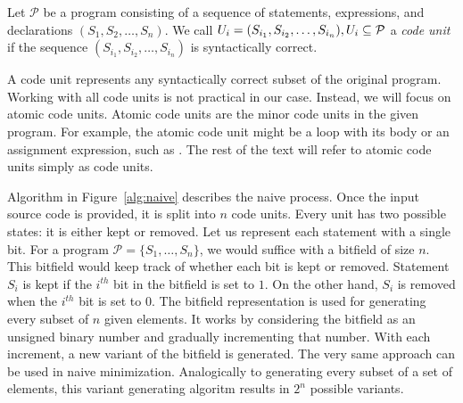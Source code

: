 \begin{defn}\label{def04:3}
  Let $\mathcal{P}$ be a program consisting of a sequence of statements, 
  expressions, and declarations $(S_1, S_2, \ldots, S_n)$. 
  We call $U_i = (S_{i_1},\-S_{i_2},\-\ldots,\-S_{i_n}), 
  U_i \subseteq \mathcal{P}$ a \emph{code unit} if the sequence 
  $(S_{i_1}, S_{i_2}, \ldots, S_{i_n})$ is syntactically
  correct.
\end{defn}

A code unit represents any syntactically correct subset of the original 
program. 
Working with all code units is not practical in our case. 
Instead, we will focus on atomic code units. 
Atomic code units are the minor code units in the given program. 
For example, the atomic code unit might be a  loop with its body 
or an assignment expression, such as .
The rest of the text will refer to atomic code units simply as code units. 

Algorithm in Figure~\ref{alg:naive} describes the naive process. 
Once the input source code is provided, it is split into $n$ code units.
Every unit has two possible states: it is either kept or removed.
Let us represent each statement with a single bit. 
For a program $\mathcal{P} = \{S_1, \ldots, S_n\}$, we would suffice with 
a bitfield of size $n$. 
This bitfield would keep track of whether each bit is kept or removed. 
Statement $S_i$ is kept if the $i^{th}$ bit in the bitfield is set to $1$. 
On the other hand, $S_i$ is removed when the $i^{th}$ bit is set to $0$.
The bitfield representation is used for generating every subset of $n$ given
elements. 
It works by considering the bitfield as an unsigned binary number and 
gradually incrementing that number. 
With each increment, a new variant of the bitfield is generated. 
The very same approach can be used in naive minimization.
Analogically to generating every subset of a set of elements, this
variant generating algoritm results in $2^n$ possible variants.

